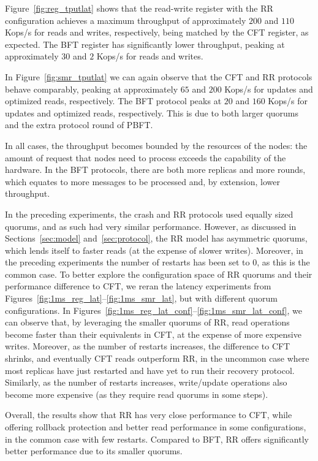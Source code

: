 Figure~\ref{fig:reg_tputlat} shows that
the read-write register with the \ac{RR} configuration achieves a maximum
throughput of approximately $200$ and $110$ Kops/s for reads and
writes, respectively, being matched by the \ac{CFT} register, as
expected. The \ac{BFT} register has significantly lower throughput,
peaking at approximately $30$ and $2$ Kops/s for reads and
writes.

In Figure~\ref{fig:smr_tputlat} we can again observe that the \ac{CFT} and
\ac{RR} protocols behave comparably, peaking at
approximately $65$ and $200$ Kops/s for updates and optimized
reads, respectively. The \ac{BFT} protocol peaks at $20$ and $160$
Kops/s for updates and optimized reads, respectively. This is due
to both larger quorums and the extra protocol round of PBFT.

In all cases, the throughput becomes bounded by the resources of
the nodes: the amount of request that nodes need to process
exceeds the capability of the hardware. In the \ac{BFT}
protocols, there are both more replicas and more rounds, which
equates to more messages to be processed and, by extension, lower
throughput.

In the preceding experiments, the crash and \ac{RR} protocols
used equally sized quorums, and as such had very similar
performance. However, as discussed in Sections~\ref{sec:model}
and~\ref{sec:protocol}, the \ac{RR} model has asymmetric quorums,
which lends itself to faster reads (at the expense of slower
writes). Moreover, in the preceding experiments the number of
restarts has been set to $0$, as this is the common case. To
better explore the configuration space of \ac{RR} quorums and
their performance difference to \ac{CFT}, we reran the latency
experiments from
Figures~\ref{fig:1ms_reg_lat}--\ref{fig:1ms_smr_lat}, but with
different quorum configurations. In
Figures~\ref{fig:1ms_reg_lat_conf}--\ref{fig:1ms_smr_lat_conf},
we can observe that, by leveraging the smaller quorums of
\ac{RR}, read operations become faster than their equivalents in
\ac{CFT}, at the expense of more expensive writes. Moreover, as
the number of restarts increases, the difference to \ac{CFT}
shrinks, and eventually \ac{CFT} reads outperform \ac{RR}, in the
uncommon case where most replicas have just restarted and have
yet to run their recovery protocol. Similarly, as the number of
restarts increases, write/update operations also become more
expensive (as they require read quorums in some steps).

Overall, the results show that \ac{RR} has very close performance
to \ac{CFT}, while offering rollback protection and better read performance
in some configurations, in the common case with few restarts.
Compared to \ac{BFT}, \ac{RR} offers significantly better performance
due to its smaller quorums.

